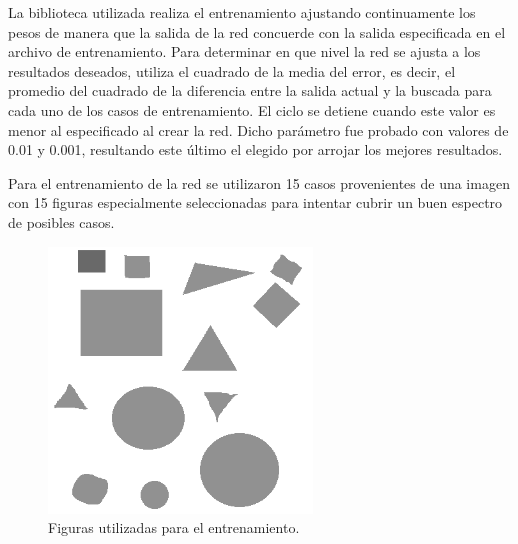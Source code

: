 \documentclass[pdftex,a4paper,10.5pt]{article}
\begin{document}
La biblioteca utilizada realiza el entrenamiento ajustando continuamente los pesos de manera que 
la salida de la red  concuerde con la salida especificada en el archivo de entrenamiento. Para 
determinar en que nivel la red se ajusta a los resultados deseados, utiliza el cuadrado de la media 
del error, es decir, el promedio del cuadrado de la diferencia entre la salida actual y la buscada para
cada uno de los casos de entrenamiento. El ciclo se detiene cuando este valor es menor al especificado
al crear la red. Dicho par\'ametro fue probado con valores de 0.01 y 0.001, resultando este \'ultimo el 
elegido por arrojar los mejores resultados.

Para el entrenamiento de la red se utilizaron 15 casos provenientes de una imagen con 15 figuras especialmente seleccionadas para intentar cubrir un buen espectro de posibles casos.
   
             \begin{figure}[H]
	                  \begin{center}
	                    \includegraphics[width=7cm]{prueba2.png}
	                    \caption{\label{entrenamiento} Figuras utilizadas para el entrenamiento. }
	                  \end{center}
	            \end{figure}



\end{document}
